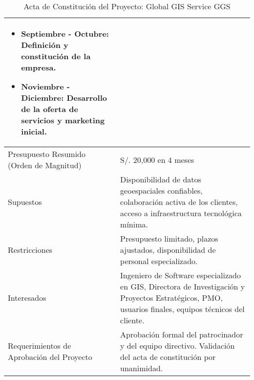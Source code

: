 \begin{table}[H]
\begin{tabular}{|p{5cm}|p{10cm}|}
\begin{itemize}
    \item Septiembre - Octubre: Definición y constitución de la empresa.
    \item Noviembre - Diciembre: Desarrollo de la oferta de servicios y marketing inicial.
\end{itemize} \\
\hline
Presupuesto Resumido (Orden de Magnitud) & S/. 20,000 en 4 meses \\
\hline
Supuestos & Disponibilidad de datos geoespaciales confiables, colaboración activa de los clientes, acceso a infraestructura tecnológica mínima. \\
\hline
Restricciones & Presupuesto limitado, plazos ajustados, disponibilidad de personal especializado. \\
\hline
Interesados & Ingeniero de Software especializado en GIS, Directora de Investigación y Proyectos Estratégicos, PMO, usuarios finales, equipos técnicos del cliente. \\
\hline
Requerimientos de Aprobación del Proyecto & Aprobación formal del patrocinador y del equipo directivo. Validación del acta de constitución por unanimidad. \\
\hline
\end{tabular}
\caption{Acta de Constitución del Proyecto: Global GIS Service GGS}
\end{table}


